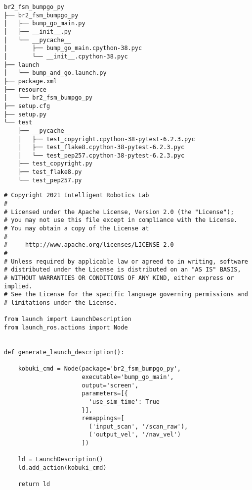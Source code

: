  \footnotesize
\begin{tcolorbox}[sharp corners, colframe=gray!80, colback=LightGray, left=0pt, top=0pt, bottom=0pt, title=Package \texttt{br2\_fsm\_bumpgo\_py}]
  \begin{verbatim}
br2_fsm_bumpgo_py
├── br2_fsm_bumpgo_py
│   ├── bump_go_main.py
│   ├── __init__.py
│   └── __pycache__
│       ├── bump_go_main.cpython-38.pyc
│       └── __init__.cpython-38.pyc
├── launch
│   └── bump_and_go.launch.py
├── package.xml
├── resource
│   └── br2_fsm_bumpgo_py
├── setup.cfg
├── setup.py
└── test
    ├── __pycache__
    │   ├── test_copyright.cpython-38-pytest-6.2.3.pyc
    │   ├── test_flake8.cpython-38-pytest-6.2.3.pyc
    │   └── test_pep257.cpython-38-pytest-6.2.3.pyc
    ├── test_copyright.py
    ├── test_flake8.py
    └── test_pep257.py    \end{verbatim}
    \end{tcolorbox}
  \normalsize

 \footnotesize
\begin{tcolorbox}[sharp corners, colframe=gray!80, colback=LightGray, left=0pt, top=0pt, bottom=0pt, title=\texttt{br2\_fsm\_bumpgo\_py/launch/bump\_and\_go.launch.py}]
  \begin{verbatim}
# Copyright 2021 Intelligent Robotics Lab
#
# Licensed under the Apache License, Version 2.0 (the "License");
# you may not use this file except in compliance with the License.
# You may obtain a copy of the License at
#
#     http://www.apache.org/licenses/LICENSE-2.0
#
# Unless required by applicable law or agreed to in writing, software
# distributed under the License is distributed on an "AS IS" BASIS,
# WITHOUT WARRANTIES OR CONDITIONS OF ANY KIND, either express or implied.
# See the License for the specific language governing permissions and
# limitations under the License.

from launch import LaunchDescription
from launch_ros.actions import Node


def generate_launch_description():

    kobuki_cmd = Node(package='br2_fsm_bumpgo_py',
                      executable='bump_go_main',
                      output='screen',
                      parameters=[{
                        'use_sim_time': True
                      }],
                      remappings=[
                        ('input_scan', '/scan_raw'),
                        ('output_vel', '/nav_vel')
                      ])

    ld = LaunchDescription()
    ld.add_action(kobuki_cmd)

    return ld
    \end{verbatim}
    \end{tcolorbox}
  \normalsize

